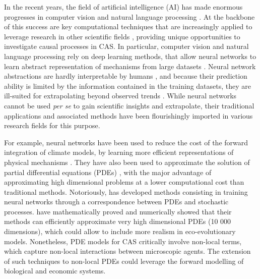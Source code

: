 In the recent years, the field of artificial intelligence (AI) has made enormous progresses in computer vision \cite{XXX} and natural language processing \cite{xXX}. At the backbone of this success are key computational techniques that are increasingly applied to leverage research in other scientific fields \cite{Kashinath2021,Schneider2017,Yazdani2020,Rolnick2023}, providing unique opportunities to investigate causal processes in CAS.
% 
% 
% 
% 
% 
In particular, computer vision and natural language processing rely on deep learning methods, that allow neural networks to learn abstract representation of mechanisms from large datasets \cite{LeCun2015}.
% 
Neural network abstractions are hardly interpretable by humans \cite{XXX}, and because their prediction ability is limited by the information contained in the training datasets, they are ill-suited for extrapolating beyond observed trends \cite{Barnosky2012,Urban2016}. %
% 
While neural networks cannot be used \textit{per se} to gain scientific insights and extrapolate, their traditional applications and associated methods have been flourishingly imported in various research fields for this purpose.

%
For example, neural networks have been used to reduce the cost of the forward integration of climate models, by learning more efficient representations of physical mechanisms \cite{XXX}.
% 
They have also been used to approximate the solution of partial differential equations (PDEs) \cite{sirignano2018dgm}, with the major advantage of approximating high dimensional problems at a lower computational cost than traditional methods.
% 
Notoriously, \cite{Arnulf} has developed methods consisting in training neural networks through a correspondence between PDEs and stochastic processes. \cite{Arnulf} have mathematically proved and numerically showed that their methods can efficiently approximate very high dimensional PDEs (10 000 dimensions), which could allow to include more realism in eco-evolutionary models.
% 
Nonetheless, PDE models for CAS critically involve non-local terms, which capture non-local interactions between microscopic agents. The extension of such techniques to non-local PDEs could leverage the forward modelling of biological and economic systems.

